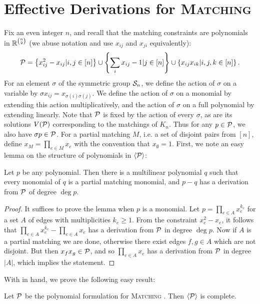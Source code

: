 \section{Effective Derivations for \textsc{Matching}}
Fix an even integer $n$, and recall that the matching constraints are polynomials in $\mathbb R^{\binom{n}{2}}$ (we abuse notation and use $x_{ij}$ and $x_{ji}$ equivalently):
\begin{align}
\mathcal P = \left\{x_{ij}^2 - x_{ij} | i,j \in [n]\right\} \cup \left\{\sum_i x_{ij} - 1 | j \in [n]\right\} \cup \left\{x_{ij}x_{ik} | i,j,k \in [n]\right\}.\label{eq:matching-formulation}
\end{align}
For an element $\sigma$ of the symmetric group $\mathcal S_n$, we define the action of $\sigma$ on a variable by $\sigma x_{ij} = x_{\sigma(i)\sigma(j)}$.
We define the action of $\sigma$ on a monomial by extending this action multiplicatively, and the action of $\sigma$ on a full polynomial by extending linearly.
Note that $\mathcal P$ is fixed by the action of every $\sigma$, as are its solutions $V(\mathcal P)$ corresponding to the matchings of $K_n$. 
Thus for any $p \in \mathcal P$, we also have $\sigma p \in \mathcal P$. For a partial matching $M$, i.e. a set of disjoint pairs from $[n]$, define $x_M = \prod_{e \in M} x_e$ with the convention that $x_{\emptyset} = 1$.
First, we note an easy lemma on the structure of polynomials in $\langle \mathcal P \rangle$:
\begin{lemma}\label{lem:monomials}
  Let $p$ be any polynomial. Then there is a multilinear polynomial $q$ such that every monomial of $q$ is a partial matching monomial, and $p-q$ has a derivation from $\mathcal P$ of degree $\deg p$.
\end{lemma}
\begin{proof}
It suffices to prove the lemma when \(p\) is a monomial. Let
\(p = \prod_{e \in A} x_{e}^{k_{e}}\)
for a set \(A\) of edges with multiplicities \(k_{e} \geq 1\).
From the constraint \(x_{e}^{2} - x_e\), it follows that
$\prod_{e \in A} x_e^{k_e} - \prod_{e \in A} x_e$ has a derivation from $\mathcal P$ in degree $\deg p$.
Now if $A$ is a partial matching we are done, otherwise there exist edges $f,g \in A$ which are not disjoint.
But then $x_fx_g \in \mathcal P$, and so $\prod_{e \in A} x_e$ has a derivation from $\mathcal P$ in degree $|A|$, which implies the statement.
\end{proof}
With  in hand, we prove the following easy result:
\begin{lemma}\label{lem:matching-complete}
Let $\mathcal P$ be the polynomial formulation for \textsc{Matching} . Then $\langle \mathcal P \rangle$ is complete. 
\end{lemma}
